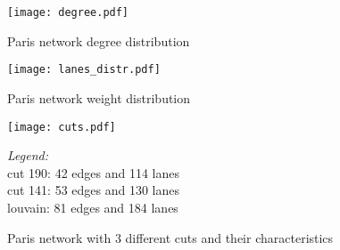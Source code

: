 \begin{figure}
    \centering
    \texttt{[image: degree.pdf]}
    \caption{Paris network degree distribution}
    \label{fig:degree}
\end{figure}

\begin{figure}
    \centering
    \texttt{[image: lanes\_distr.pdf]}
    \caption{Paris network weight distribution}
    \label{fig:lanes}
\end{figure}


\begin{figure}
    \begin{multicols}{2}
        \texttt{[image: cuts.pdf]}
        \begin{boxB}
            \begin{center}
                \emph{Legend:}\\
                \color{red} cut 190: 42 edges and 114 lanes\\
                \color{violet} cut 141: 53 edges and 130 lanes\\
                \color{orange} louvain: 81 edges and 184 lanes
            \end{center}
        \end{boxB}
    \end{multicols}
    \caption{Paris network with 3 different cuts and their characteristics}
    \label{fig:cuts}
\end{figure}

